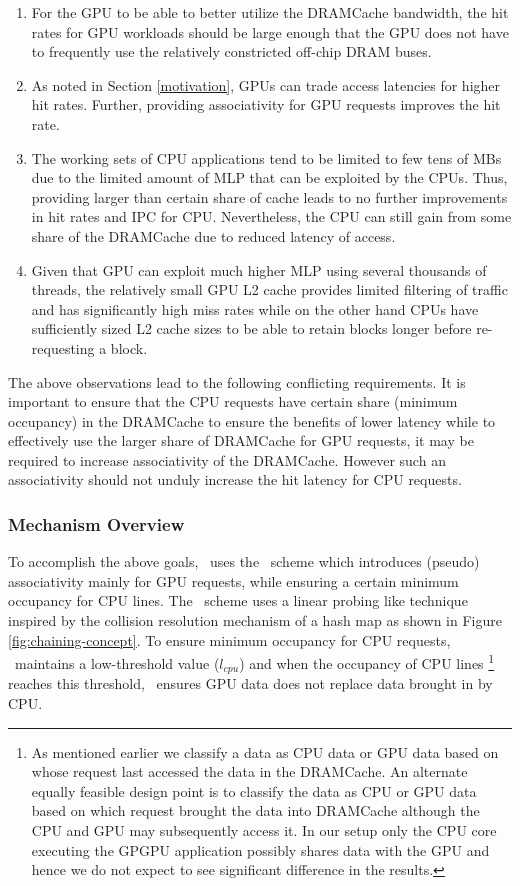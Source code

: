\begin{enumerate}[label=(\roman*)]
	\item For the GPU to be able to better utilize the DRAMCache bandwidth, the hit rates for GPU workloads should be large enough that the GPU does not have to frequently use the relatively constricted off-chip DRAM buses.
	\item As noted in Section \ref{motivation}, GPUs can trade access latencies for higher hit rates. Further, providing associativity for GPU requests improves the hit rate. 
	\item The working sets of CPU applications tend to be limited to few tens of MBs due to the limited amount of MLP that can be exploited by the CPUs. Thus, providing larger than certain share of cache leads to no further improvements in hit rates and IPC for CPU. Nevertheless, the CPU can still gain from some share of the DRAMCache due to reduced latency of access.
	\item Given that GPU can exploit much higher MLP using several thousands of threads, the relatively small GPU L2 cache provides limited filtering of traffic and has significantly high miss rates while on the other hand CPUs have sufficiently sized L2 cache sizes to be able to retain blocks longer before re-requesting a block.	
\end{enumerate}

\par The above observations lead to the following conflicting requirements. It is important to ensure that the CPU requests have certain share (minimum occupancy) in the DRAMCache to ensure the benefits of lower latency while to effectively use the larger share of DRAMCache for GPU requests, it may be required to increase  associativity of the DRAMCache. However such an associativity should not unduly increase the hit latency for CPU requests. 

\subsubsection{Mechanism Overview}
\par To accomplish the above goals, \cachename\ uses the \chaining\ scheme which introduces (pseudo) associativity mainly for GPU requests, while ensuring a certain minimum occupancy for CPU lines. The \chaining\ scheme uses a linear probing \cite{knuth-linear-probing} like technique inspired by the collision resolution mechanism of a hash map as shown in Figure \ref{fig:chaining-concept}.
To ensure minimum occupancy for CPU requests, \chaining\ maintains a low-threshold value (\textit{$l_{cpu}$}) and when the occupancy of CPU lines
\footnote{As mentioned earlier we classify a data as CPU data or GPU data based on whose request last accessed the data in the DRAMCache. An alternate equally feasible design point is to classify the data as CPU or GPU data based on which request brought the data into DRAMCache although the CPU and GPU may subsequently access it. In our setup only the CPU core executing the GPGPU application possibly shares data with the GPU and hence we do not expect to see significant difference in the results.} 
reaches this threshold, \chaining\ ensures GPU data does not replace data brought in by CPU. 

